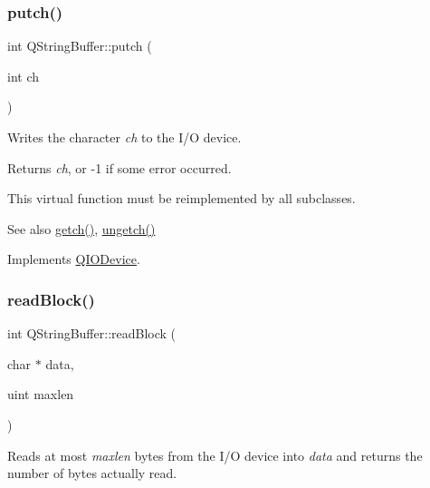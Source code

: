 \mbox{\label{class_q_string_buffer_ac95cff6e837ae523527b9d78cb6a4074}} 
\subsubsection{\texorpdfstring{putch()}{putch()}}
{\footnotesize\ttfamily int Q\+String\+Buffer\+::putch (\begin{DoxyParamCaption}\item[{int}]{ch }\end{DoxyParamCaption})\hspace{0.3cm}{\ttfamily [virtual]}}

Writes the character {\itshape ch} to the I/O device.

Returns {\itshape ch}, or -\/1 if some error occurred.

This virtual function must be reimplemented by all subclasses.

\begin{DoxySeeAlso}{See also}
\mbox{\hyperlink{class_q_string_buffer_acebe86e5beeaff3863673fc56089e2da}{getch()}}, \mbox{\hyperlink{class_q_string_buffer_ad6e53fb9f2f2969b9f9a7a1daa2d7af2}{ungetch()}} 
\end{DoxySeeAlso}


Implements \mbox{\hyperlink{class_q_i_o_device_a5de5c1c1cba7ca36ba93289e30cd3029}{Q\+I\+O\+Device}}.

\mbox{\label{class_q_string_buffer_a6cda82dda018af5291df80676eb037a4}} 
\subsubsection{\texorpdfstring{readBlock()}{readBlock()}}
{\footnotesize\ttfamily int Q\+String\+Buffer\+::read\+Block (\begin{DoxyParamCaption}\item[{char $\ast$}]{data,  }\item[{uint}]{maxlen }\end{DoxyParamCaption})\hspace{0.3cm}{\ttfamily [virtual]}}

Reads at most {\itshape maxlen} bytes from the I/O device into {\itshape data} and returns the number of bytes actually read.

